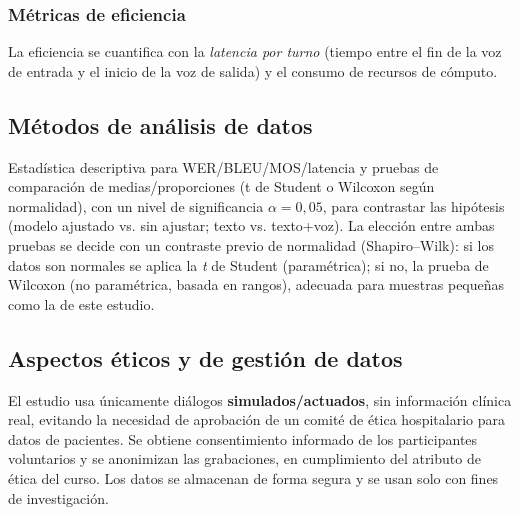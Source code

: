 \documentclass[12pt,a4paper]{article}
\newcommand{\nuevo}[1]{#1}
\begin{document}
\subsubsection{M{\'e}tricas de eficiencia}
La eficiencia se cuantifica con la \emph{latencia por turno} (tiempo entre el fin de la voz de
entrada y el inicio de la voz de salida) y el consumo de recursos de c{\'o}mputo.

\subsection{M{\'e}todos de an{\'a}lisis de datos}
Estad{\'i}stica descriptiva para WER/BLEU/MOS/latencia y pruebas de comparaci{\'o}n de
medias/proporciones (t de Student o Wilcoxon seg{\'u}n normalidad), con un nivel de significancia
$\alpha = 0{,}05$, para contrastar las hip{\'o}tesis (modelo ajustado vs. sin ajustar; texto vs.
texto+voz). \nuevo{La elecci{\'o}n entre ambas pruebas se decide con un contraste previo de
normalidad (Shapiro--Wilk): si los datos son normales se aplica la \emph{t} de Student
(param{\'e}trica); si no, la prueba de Wilcoxon (no param{\'e}trica, basada en rangos), adecuada para
muestras peque{\~n}as como la de este estudio.}

\subsection{Aspectos {\'e}ticos y de gesti{\'o}n de datos}
El estudio usa {\'u}nicamente di{\'a}logos \textbf{simulados/actuados}, sin informaci{\'o}n cl{\'i}nica
real, evitando la necesidad de aprobaci{\'o}n de un comit{\'e} de {\'e}tica hospitalario para datos de
pacientes. Se obtiene consentimiento informado de los participantes voluntarios y se anonimizan las
grabaciones, en cumplimiento del atributo de {\'e}tica del curso. Los datos se almacenan de forma
segura y se usan solo con fines de investigaci{\'o}n.
\end{document}

